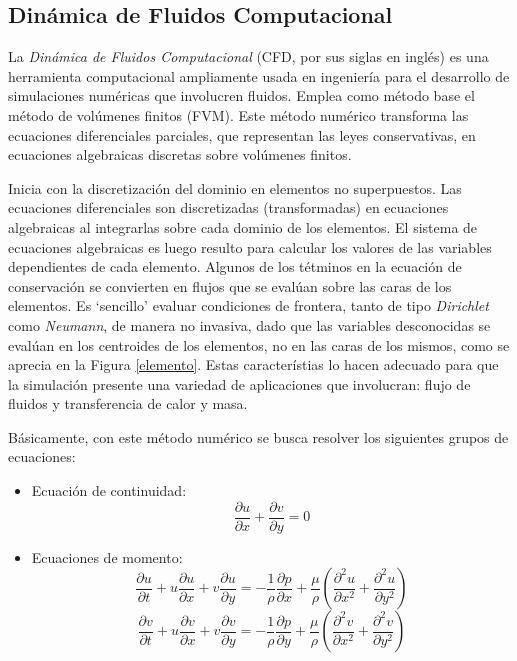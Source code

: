 \subsection{Din\'amica de Fluidos Computacional} \label{DFC}

\noindent
\justify

La \textit{Din\'amica de Fluidos Computacional} (CFD, por sus siglas en ingl\'es) es una herramienta computacional ampliamente usada en ingenier\'ia para el desarrollo de simulaciones num\'ericas que involucren fluidos. Emplea como m\'etodo base el m\'etodo de vol\'umenes finitos (FVM). Este m\'etodo num\'erico transforma las ecuaciones diferenciales parciales, que representan las leyes conservativas, en ecuaciones algebraicas discretas sobre vol\'umenes finitos. 

\noindent
\justify

Inicia con la discretizaci\'on del dominio en elementos no superpuestos. Las ecuaciones diferenciales son discretizadas (transformadas) en ecuaciones algebraicas al integrarlas sobre cada dominio de los elementos. El sistema de ecuaciones algebraicas es luego resulto para calcular los valores de las variables dependientes de cada elemento. Algunos de los t\'etminos en la ecuaci\'on de conservaci\'on se convierten en flujos que se eval\'uan sobre las caras de los elementos. Es `sencillo' evaluar condiciones de frontera, tanto de tipo \textit{Dirichlet} como \textit{Neumann}, de manera no invasiva, dado que las variables desconocidas se eval\'uan en los centroides de los elementos, no en las caras de los mismos, como se aprecia en la Figura \ref{elemento}. Estas caracter\'istias lo hacen adecuado para que la simulaci\'on presente una variedad de aplicaciones que involucran: flujo de fluidos y transferencia de calor y masa.

\noindent
\justify

B\'asicamente, con este m\'etodo num\'erico se busca resolver los siguientes grupos de ecuaciones:

\begin{itemize}
	\item Ecuaci\'on de continuidad:
	\begin{equation*}
		\frac{\partial u}{\partial x} + \frac{\partial v}{\partial y} = 0
	\end{equation*}
	\item Ecuaciones de momento:
	\begin{equation*}
			\frac{\partial u}{\partial t} + u \frac{\partial u}{\partial x} + v \frac{\partial u}{\partial y} = - \frac{1}{\rho} \frac{\partial p}{\partial x} + \frac{\mu}{\rho} \left( \frac{\partial ^2 u}{\partial x ^2} + \frac{\partial ^2 u}{\partial y ^2} \right)
	\end{equation*}
	\begin{equation*}
			\frac{\partial v}{\partial t} + u \frac{\partial v}{\partial x} + v \frac{\partial v}{\partial y} = - \frac{1}{\rho} \frac{\partial p}{\partial y} + \frac{\mu}{\rho} \left( \frac{\partial ^2 v}{\partial x ^2} + \frac{\partial ^2 v}{\partial y ^2} \right)
	\end{equation*}
\end{itemize}

